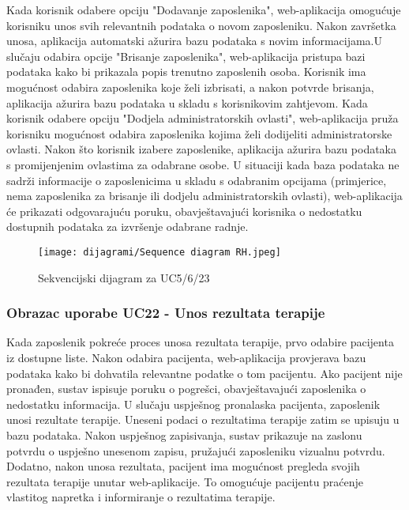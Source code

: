                     
                    Kada korisnik odabere opciju "Dodavanje zaposlenika", web-aplikacija omogućuje korisniku unos svih relevantnih podataka o novom zaposleniku. Nakon završetka unosa, aplikacija automatski ažurira bazu podataka s novim informacijama.U slučaju odabira opcije "Brisanje zaposlenika", web-aplikacija pristupa bazi podataka kako bi prikazala popis trenutno zaposlenih osoba. Korisnik ima mogućnost odabira zaposlenika koje želi izbrisati, a nakon potvrde brisanja, aplikacija ažurira bazu podataka u skladu s korisnikovim zahtjevom. Kada korisnik odabere opciju "Dodjela administratorskih ovlasti", web-aplikacija pruža korisniku mogućnost odabira zaposlenika kojima želi dodijeliti administratorske ovlasti. Nakon što korisnik izabere zaposlenike, aplikacija ažurira bazu podataka s promijenjenim ovlastima za odabrane osobe. U situaciji kada baza podataka ne sadrži informacije o zaposlenicima u skladu s odabranim opcijama (primjerice, nema zaposlenika za brisanje ili dodjelu administratorskih ovlasti), web-aplikacija će prikazati odgovarajuću poruku, obavještavajući korisnika o nedostatku dostupnih podataka za izvršenje odabrane radnje.

                \begin{figure}[H]
			         \texttt{[image: dijagrami/Sequence diagram RH.jpeg]}
			         \centering
			         \caption{Sekvencijski dijagram za UC5/6/23}
			         \label{fig:SequenceDiagram1}
		        \end{figure}

                \eject

                \subsubsection{Obrazac uporabe UC22 - Unos rezultata terapije}

                    Kada zaposlenik pokreće proces unosa rezultata terapije, prvo odabire pacijenta iz dostupne liste. Nakon odabira pacijenta, web-aplikacija provjerava bazu podataka kako bi dohvatila relevantne podatke o tom pacijentu. Ako pacijent nije pronađen, sustav ispisuje poruku o pogrešci, obavještavajući zaposlenika o nedostatku informacija. U slučaju uspješnog pronalaska pacijenta, zaposlenik unosi rezultate terapije. Uneseni podaci o rezultatima terapije zatim se upisuju u bazu podataka. Nakon uspješnog zapisivanja, sustav prikazuje na zaslonu potvrdu o uspješno unesenom zapisu, pružajući zaposleniku vizualnu potvrdu. Dodatno, nakon unosa rezultata, pacijent ima mogućnost pregleda svojih rezultata terapije unutar web-aplikacije. To omogućuje pacijentu praćenje vlastitog napretka i informiranje o rezultatima terapije. 

